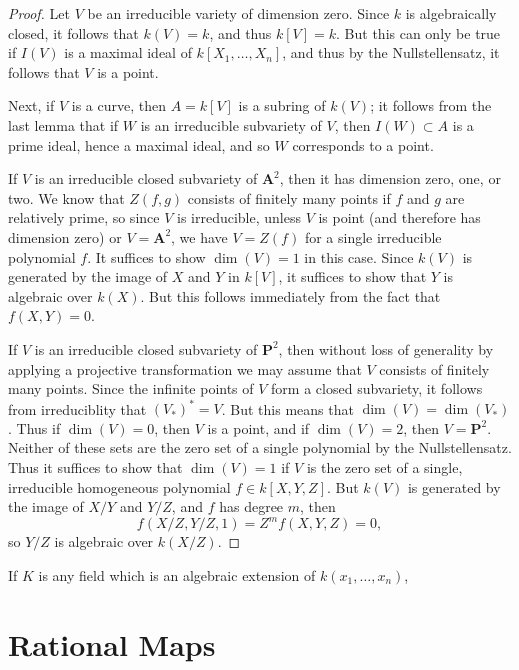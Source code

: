 \begin{proof}
    Let $V$ be an irreducible variety of dimension zero. Since $k$ is algebraically closed, it follows that $k(V) = k$, and thus $k[V] = k$. But this can only be true if $I(V)$ is a maximal ideal of $k[X_1,\dots,X_n]$, and thus by the Nullstellensatz, it follows that $V$ is a point.

    Next, if $V$ is a curve, then $A = k[V]$ is a subring of $k(V)$; it follows from the last lemma that if $W$ is an irreducible subvariety of $V$, then $I(W) \subset A$ is a prime ideal, hence a maximal ideal, and so $W$ corresponds to a point.

    If $V$ is an irreducible closed subvariety of $\mathbf{A}^2$, then it has dimension zero, one, or two. We know that $Z(f,g)$ consists of finitely many points if $f$ and $g$ are relatively prime, so since $V$ is irreducible, unless $V$ is point (and therefore has dimension zero) or $V = \mathbf{A}^2$, we have $V = Z(f)$ for a single irreducible polynomial $f$. It suffices to show $\dim(V) = 1$ in this case. Since $k(V)$ is generated by the image of $X$ and $Y$ in $k[V]$, it suffices to show that $Y$ is algebraic over $k(X)$. But this follows immediately from the fact that $f(X,Y) = 0$.

    If $V$ is an irreducible closed subvariety of $\mathbf{P}^2$, then without loss of generality by applying a projective transformation we may assume that $V$ consists of finitely many points. Since the infinite points of $V$ form a closed subvariety, it follows from irreduciblity that $(V_*)^* = V$. But this means that $\dim(V) = \dim(V_*)$. Thus if $\dim(V) = 0$, then $V$ is a point, and if $\dim(V) = 2$, then $V = \mathbf{P}^2$. Neither of these sets are the zero set of a single polynomial by the Nullstellensatz. Thus it suffices to show that $\dim(V) = 1$ if $V$ is the zero set of a single, irreducible homogeneous polynomial $f \in k[X,Y,Z]$. But $k(V)$ is generated by the image of $X/Y$ and $Y/Z$, and $f$ has degree $m$, then
    \[ f(X/Z,Y/Z,1) = Z^m f(X,Y,Z) = 0, \]
    so $Y/Z$ is algebraic over $k(X/Z)$.
\end{proof}

If $K$ is any field which is an algebraic extension of $k(x_1,\dots,x_n)$,

\section{Rational Maps}

